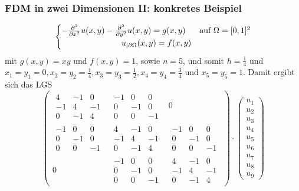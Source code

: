 \begin{frame}\frametitle{FDM in zwei Dimensionen II: konkretes Beispiel}
$$
\begin{cases} -\frac{\partial^2}{\partial x^2}u(x,y)-\frac{\partial^2}{\partial y^2}u(x,y)= g(x,y) & \text{auf } \Omega =[0,1]^2\\\hspace{25.5mm}u_{|\partial \Omega}(x,y)=f(x,y)
\end{cases}
$$
mit $g(x,y)=xy$ und $f(x,y)=1$, sowie $n=5$, und somit $h=\frac{1}{4}$ und $x_1=y_1=0, x_2=y_2=\frac{1}{4}, x_3=y_3=\frac{1}{2}, x_4=y_4=\frac{3}{4}$ und $x_5=y_5=1$.
Damit ergibt sich das LGS 
\tiny
$$
\left(\begin{array}{c|c|c} 
	\begin{array}{rrr}4 &-1 &0\\ -1 & 4 &-1 \\ 0&-1&4 \end{array}
	& \begin{array}{rrr} -1& 0&0 \\ 0 & -1&0 \\ 0&0&-1\end{array}
	& 0
 \\\hline 
	\begin{array}{rrr}-1& 0&0 \\ 0 & -1&0 \\ 0&0&-1 \end{array}
	& \begin{array}{rrr}4 &-1 &0\\ -1 & 4 &-1 \\ 0&-1&4  \end{array}
	& \begin{array}{rrr} -1& 0&0 \\ 0 & -1&0 \\ 0&0&-1\end{array}
\\\hline 
	0
	&\begin{array}{rrr}-1& 0&0 \\ 0 & -1&0 \\ 0&0&-1 \end{array}
	& \begin{array}{rrr}4 &-1 &0\\ -1 & 4 &-1 \\ 0&-1&4  \end{array} 
\end{array}\right)
\cdot
\begin{pmatrix}u_1\\u_2\\u_3\\u_4\\u_5\\u_6\\u_7\\u_8\\u_9 \end{pmatrix}
$$
\end{frame}

